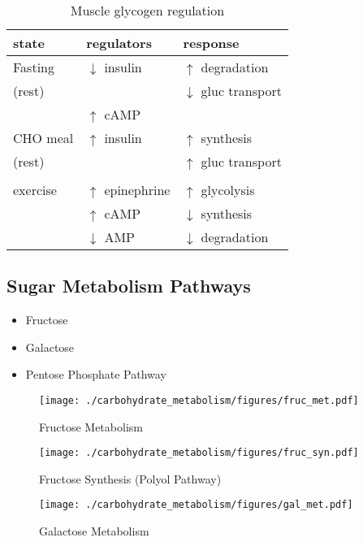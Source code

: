 \documentclass{scrartcl}
\begin{document}
\begin{table}[htbp]
\caption{\label{tab:org1bd50f3}
Muscle glycogen regulation}
\centering
\begin{tabular}{lll}
state & regulators & response\\
\hline
Fasting & \(\downarrow\) insulin & \(\uparrow\) degradation\\
(rest) &  & \(\downarrow\) gluc transport\\
 & \(\uparrow\) cAMP & \\
CHO meal & \(\uparrow\) insulin & \(\uparrow\) synthesis\\
(rest) &  & \(\uparrow\) gluc transport\\
 &  & \\
exercise & \(\uparrow\) epinephrine & \(\uparrow\) glycolysis\\
 & \(\uparrow\) cAMP & \(\downarrow\) synthesis\\
 & \(\downarrow\) AMP & \(\downarrow\) degradation\\
\end{tabular}
\end{table}

\subsection{Sugar Metabolism Pathways}
\label{sec:org77b844d}
\begin{itemize}
\item Fructose
\item Galactose
\item Pentose Phosphate Pathway
\end{itemize}

\begin{figure}[htbp]
\centering
\texttt{[image: ./carbohydrate\_metabolism/figures/fruc\_met.pdf]}
\caption{\label{fig:orgc97d181}
Fructose Metabolism}
\end{figure}

\begin{figure}[htbp]
\centering
\texttt{[image: ./carbohydrate\_metabolism/figures/fruc\_syn.pdf]}
\caption{\label{fig:org8db0c51}
Fructose Synthesis (Polyol Pathway)}
\end{figure}

\begin{figure}[htbp]
\centering
\texttt{[image: ./carbohydrate\_metabolism/figures/gal\_met.pdf]}
\caption{\label{fig:orgb9b157e}
Galactose Metabolism}
\end{figure}
\end{document}
